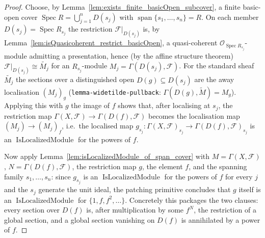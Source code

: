 \begin{proof}
  Choose, by Lemma~\ref{lem:exists_finite_basicOpen_subcover}, a finite basic-open cover
  \(\operatorname{Spec} R = \bigcup_{j=1}^{n} D(s_j)\) with
  \(\operatorname{span}\{s_1, \ldots, s_n\} = R\). On each member
  \(D(s_j) = \operatorname{Spec} R_{s_j}\) the restriction \(\mathcal{F}|_{D(s_j)}\) is, by
  Lemma~\ref{lem:isQuasicoherent_restrict_basicOpen}, a quasi-coherent
  \(\mathcal{O}_{\operatorname{Spec} R_{s_j}}\)-module admitting a presentation, hence (by the
  affine structure theorem) \(\mathcal{F}|_{D(s_j)} \cong \widetilde{M_j}\) for an
  \(R_{s_j}\)-module \(M_j = \Gamma(D(s_j), \mathcal{F})\). For the standard sheaf
  \(\widetilde{M_j}\) the sections over a distinguished open \(D(g) \subseteq D(s_j)\) are
  the away localisation \((M_j)_g\) (\texttt{lemma-widetilde-pullback}:
  \(\Gamma(D(g), \widetilde{M}) = M_g\)). Applying this with \(g\) the image of \(f\) shows
  that, after localising at \(s_j\), the restriction map
  \(\Gamma(X, \mathcal{F}) \to \Gamma(D(f), \mathcal{F})\) becomes the localisation map
  \((M_j) \to (M_j)_f\), i.e.\ the localised map
  \(g_{s_j} : \Gamma(X, \mathcal{F})_{s_j} \to \Gamma(D(f), \mathcal{F})_{s_j}\) is an
  \(\operatorname{IsLocalizedModule}\) for the powers of \(f\).

  Now apply Lemma~\ref{lem:isLocalizedModule_of_span_cover} with \(M = \Gamma(X, \mathcal{F})\),
  \(N = \Gamma(D(f), \mathcal{F})\), the restriction map \(g\), the element \(f\), and the
  spanning family \(s_1, \ldots, s_n\): since \(g_{s_j}\) is an
  \(\operatorname{IsLocalizedModule}\) for the powers of \(f\) for every \(j\) and the
  \(s_j\) generate the unit ideal, the patching primitive concludes that \(g\) itself is an
  \(\operatorname{IsLocalizedModule}\) for \(\{1, f, f^2, \ldots\}\). Concretely this packages
  the two clauses: every section over \(D(f)\) is, after multiplication by some \(f^N\), the
  restriction of a global section, and a global section vanishing on \(D(f)\) is annihilated
  by a power of \(f\).
\end{proof}

